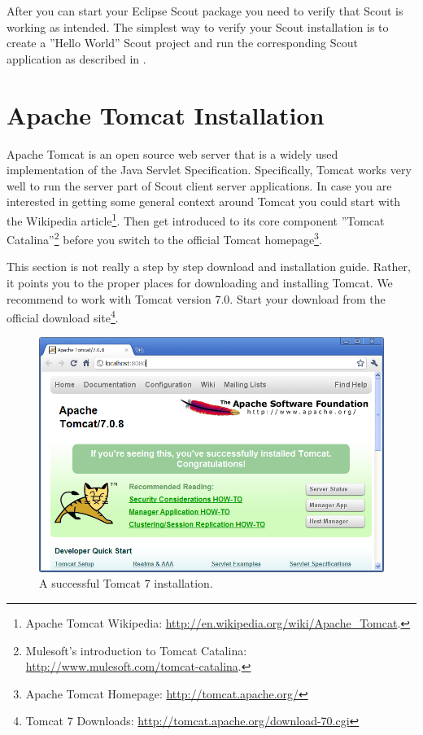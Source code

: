 \documentclass[a4paper,10pt,twoside]{book}
\begin{document}
After you can start your Eclipse Scout package you need to verify that Scout is working as intended.
The simplest way to verify your Scout installation is to create a ''Hello World'' Scout project and run the corresponding Scout application as described in .

\chapter{Apache Tomcat Installation}

Apache Tomcat is an open source web server that is a widely used implementation of the Java Servlet Specification.
Specifically, Tomcat works very well to run the server part of Scout client server applications.
In case you are interested in getting some general context around Tomcat you could start with the Wikipedia article\footnote{
Apache Tomcat Wikipedia: \url{http://en.wikipedia.org/wiki/Apache_Tomcat}.
}.
Then get introduced to its core component ''Tomcat Catalina''\footnote{
Mulesoft's introduction to Tomcat Catalina: \url{http://www.mulesoft.com/tomcat-catalina}.
}
before you switch to the official Tomcat homepage\footnote{
Apache Tomcat Homepage: \url{http://tomcat.apache.org/}
}.

This section is not really a step by step download and installation guide. 
Rather, it points you to the proper places for downloading and installing Tomcat.
We recommend to work with Tomcat version 7.0.
Start your download from the official download site\footnote{
Tomcat 7 Downloads: \url{http://tomcat.apache.org/download-70.cgi}
}.

\begin{figure}
\includegraphics[width=14cm]{tomcat_install.png}
\caption{A successful Tomcat 7 installation.}
\end{figure}
\end{document}
